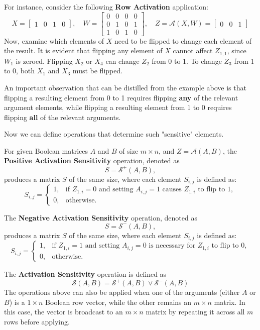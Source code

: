 \documentclass[pmlr]{jmlr}
\begin{document}
For instance, consider the following \textbf{Row Activation} application:
\[
    X = \begin{bmatrix} 1 & 0 & 1 & 0 \end{bmatrix}, \quad
    W = \begin{bmatrix} 0 & 0 & 0 & 0 \\ 0 & 1 & 0 & 1 \\ 1 & 0 & 1 & 0 \end{bmatrix}, \quad
    Z = \mathcal{A}(X, W) = \begin{bmatrix} 0 & 0 & 1 \end{bmatrix}
\]
Now, examine which elements of \( X \) need to be flipped to change each element of the result. It is evident that flipping any element of \( X \) cannot affect \( Z_{1,1} \), since \( W_1 \) is zeroed. Flipping \( X_2 \) or \( X_4 \) can change \( Z_2 \) from 0 to 1. To change \( Z_3 \) from 1 to 0, both \( X_1 \) and \( X_3 \) must be flipped.

An important observation that can be distilled from the example above is that flipping a resulting element from 0 to 1 requires flipping \textbf{any} of the relevant argument elements, while flipping a resulting element from 1 to 0 requires flipping \textbf{all} of the relevant arguments.

Now we can define operations that determine such "sensitive" elements.

\begin{definition}
    For given Boolean matrices \( A \) and \( B \) of size \( m \times n \), and \( Z = \mathcal{A}(A, B) \), the \textbf{Positive Activation Sensitivity} operation, denoted as
    \[ S = \mathcal{S}^+(A, B), \]
    produces a matrix \( S \) of the same size, where each element \( S_{i,j} \) is defined as:
    \[ S_{i,j} =
        \begin{cases}
            1, & \text{if } Z_{1,i} = 0 \text{ and setting } A_{i,j} = 1 \text{ causes } Z_{1,i} \text{ to flip to } 1, \\
            0, & \text{otherwise}.
        \end{cases}
    \]

    The \textbf{Negative Activation Sensitivity} operation, denoted as
    \[ S = \mathcal{S}^-(A, B), \]
    produces a matrix \( S \) of the same size, where each element \( S_{i,j} \) is defined as:
    \[ S_{i,j} =
        \begin{cases}
            1, & \text{if } Z_{1,i} = 1 \text{ and setting } A_{i,j} = 0 \text{ is necessary for } Z_{1,i} \text{ to flip to } 0, \\
            0, & \text{otherwise}.
        \end{cases}
    \]

    The \textbf{Activation Sensitivity} operation is defined as
    \[ \mathcal{S}(A, B) = \mathcal{S}^+(A, B) \vee \mathcal{S}^-(A, B) \]
    The operations above can also be applied when one of the arguments (either \( A \) or \( B \)) is a \( 1 \times n \) Boolean row vector, while the other remains an \( m \times n \) matrix. In this case, the vector is broadcast to an \( m \times n \) matrix by repeating it across all \( m \) rows before applying.
\end{definition}
\end{document}
